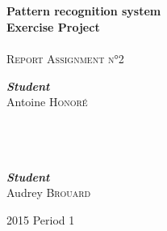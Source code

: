 \begin{titlepage}
  \begin{sffamily}
    \begin{center}

      \textsc{ }\\[1.5cm]

      \HRule \\[0.4cm]
      { \Huge \bfseries Pattern recognition system\\Exercise Project\\[0.4cm] }
      \HRule \\[2.5cm]
      \textsc{\LARGE Report Assignment n°2}~\\[2.5cm]
      \begin{minipage}{0.4\textwidth}
        \begin{flushleft} \large
          \emph{\textbf{Student}}\\
          Antoine \textsc{Honoré}\\
          ~\\~\\~\\
        \end{flushleft}
      \end{minipage}
      \hfill
      \begin{minipage}{0.4\textwidth}
        \begin{flushright} \large
          \emph{\textbf{Student}}\\
          Audrey \textsc{Brouard}\\
        \end{flushright}
      \end{minipage}

     

      \vfill

      {\large 2015 Period 1}

    \end{center}
  \end{sffamily}

\end{titlepage}


